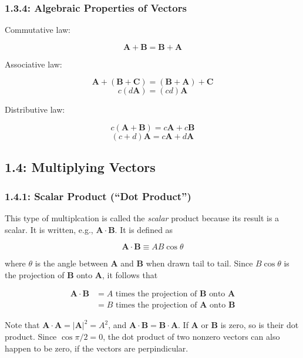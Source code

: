 \documentclass[12pt,twoside]{article}
\begin{document}
\begin{flushleft}
\subsubsection*{1.3.4: Algebraic Properties of Vectors}

Commutative law:

$$
\mathbf{A} + \mathbf{B} = \mathbf{B} + \mathbf{A}
$$

Associative law:

$$
\mathbf{A} + \left(\mathbf{B} + \mathbf{C}\right)= \left(\mathbf{B} + \mathbf{A}\right) + \mathbf{C}
$$
$$
\mathit{c}\left(\mathit{d}\mathbf{A}\right) = \left(\mathit{c}\mathit{d}\right)\mathbf{A}
$$

Distributive law:

$$
\mathit{c}\left(\mathbf{A} + \mathbf{B}\right) = \mathit{c}\mathbf{A} + \mathit{c}\mathbf{B}
$$
$$
\left(\mathit{c} + \mathit{d}\right)\mathbf{A} = \mathit{c}\mathbf{A} + \mathit{d}\mathbf{A}
$$

\subsection*{1.4: Multiplying Vectors}
\subsubsection*{1.4.1: Scalar Product (``Dot Product'')}

This type of multiplcation is called the \textit{scalar} product because its result is a scalar. It is written, e.g., $\mathbf{A}\cdot\mathbf{B}$.
It is defined as

$$
\mathbf{A}\cdot\mathbf{B} \equiv \mathit{A}\mathit{B}\cos{\theta}
$$

where $\theta$ is the angle between $\mathbf{A}$ and $\mathbf{B}$ when drawn tail to tail. Since $\mathit{B}\cos{\theta}$ is the projection of
$\mathbf{B}$ onto $\mathbf{A}$, it follows that

\begin{align*}
\mathbf{A}\cdot\mathbf{B} &= \mathit{A} \text{ times the projection of $\mathbf{B}$ onto $\mathbf{A}$} \\
& = \mathit{B} \text{ times the projection of $\mathbf{A}$ onto $\mathbf{B}$}
\end{align*}

Note that $\mathbf{A} \cdot \mathbf{A} = \left|\mathbf{A}\right|^{2} = \mathit{A}^2$, and $\mathbf{A}\cdot\mathbf{B} = \mathbf{B}\cdot\mathbf{A}$.
If $\mathbf{A}$ or $\mathbf{B}$ is zero, so is their dot product. Since $\cos{\pi/2} = 0$, the dot product of two nonzero vectors can also happen
to be zero, if the vectors are perpindicular.


\end{flushleft}
\end{document}
